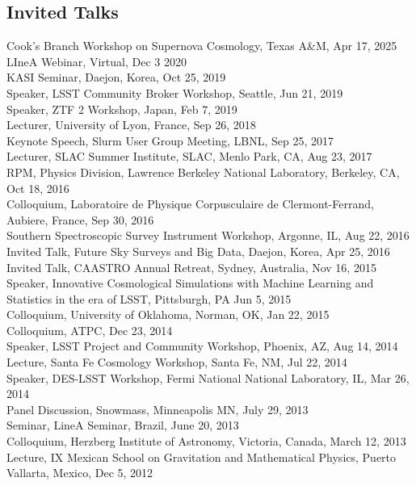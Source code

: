 \documentclass[line, margin]{res}
\begin{document}
\begin{resume}
\section{Invited Talks}
Cook's Branch Workshop on Supernova Cosmology, Texas A&M, Apr 17, 2025
LIneA Webinar, Virtual, Dec 3 2020\\
KASI Seminar, Daejon, Korea, Oct 25, 2019\\
Speaker, LSST Community Broker Workshop, Seattle, Jun 21, 2019\\
Speaker, ZTF 2 Workshop, Japan, Feb 7, 2019\\
Lecturer, University of Lyon, France, Sep 26, 2018 \\
Keynote Speech, Slurm User Group Meeting, LBNL, Sep 25, 2017\\
Lecturer, SLAC Summer Institute, SLAC, Menlo Park, CA, Aug 23, 2017\\
RPM, Physics Division, Lawrence Berkeley National Laboratory, Berkeley, CA, Oct 18, 2016\\
Colloquium, Laboratoire de Physique Corpusculaire de Clermont-Ferrand, Aubiere, France, Sep 30, 2016\\
Southern Spectroscopic Survey Instrument Workshop, Argonne, IL, Aug 22, 2016\\
Invited Talk, Future Sky Surveys and Big Data, Daejon, Korea, Apr 25, 2016\\
Invited Talk, CAASTRO Annual Retreat, Sydney, Australia, Nov 16, 2015\\
Speaker, Innovative Cosmological Simulations with Machine Learning and Statistics in the era of LSST, Pittsburgh, PA  Jun 5, 2015\\
Colloquium, University of Oklahoma, Norman, OK, Jan 22, 2015\\
Colloquium, ATPC, Dec 23, 2014\\
Speaker, LSST Project and Community Workshop, Phoenix, AZ, Aug 14, 2014\\
Lecture, Santa Fe Cosmology Workshop, Santa Fe, NM, Jul 22, 2014\\
Speaker, DES-LSST Workshop, Fermi National National Laboratory, IL, Mar 26, 2014\\
Panel Discussion, Snowmass, Minneapolis MN, July 29, 2013\\
Seminar, LineA Seminar, Brazil, June 20, 2013\\
Colloquium, Herzberg Institute of Astronomy, Victoria, Canada, March 12, 2013\\
Lecture, IX Mexican School on Gravitation and Mathematical Physics, Puerto Vallarta, Mexico, Dec 5, 2012\\

\end{resume}
\end{document}
